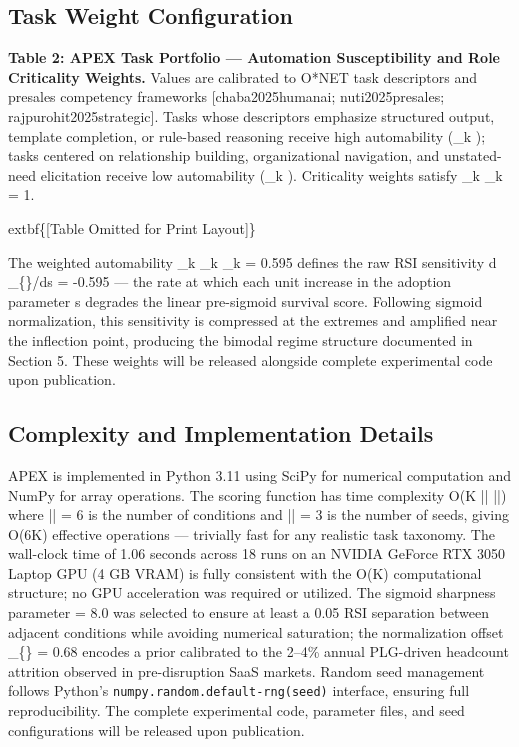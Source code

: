\documentclass[10pt, conference]{IEEEtran}
\begin{document}
{\subsection{Task Weight Configuration}

\label{sec:task_weight_configuration}

\textbf{Table 2: APEX Task Portfolio --- Automation Susceptibility and Role Criticality Weights.} Values are calibrated to O*NET task descriptors and presales competency frameworks [chaba2025humanai; nuti2025presales; rajpurohit2025strategic]. Tasks whose descriptors emphasize structured output, template completion, or rule-based reasoning receive high automability (\alpha\_k ); tasks centered on relationship building, organizational navigation, and unstated-need elicitation receive low automability (\alpha\_k ). Criticality weights satisfy \sum\_k \beta\_k = 1.

	extbf\{[Table Omitted for Print Layout]\}

The weighted automability \sum\_k \beta\_k \alpha\_k = 0.595 defines the raw RSI sensitivity d\,\_\{\}/ds = -0.595 --- the rate at which each unit increase in the adoption parameter s degrades the linear pre-sigmoid survival score. Following sigmoid normalization, this sensitivity is compressed at the extremes and amplified near the inflection point, producing the bimodal regime structure documented in Section 5. These weights will be released alongside complete experimental code upon publication.

\subsection{Complexity and Implementation Details}

\label{sec:complexity_and_implementation_details}

APEX is implemented in Python 3.11 using SciPy \cite{virtanen2020scipy} for numerical computation and NumPy for array operations. The scoring function has time complexity O(K \cdot || \cdot |\Xi|) where || = 6 is the number of conditions and |\Xi| = 3 is the number of seeds, giving O(6K) effective operations --- trivially fast for any realistic task taxonomy. The wall-clock time of 1.06 seconds across 18 runs on an NVIDIA GeForce RTX 3050 Laptop GPU (4 GB VRAM) is fully consistent with the O(K) computational structure; no GPU acceleration was required or utilized. The sigmoid sharpness parameter \lambda = 8.0 was selected to ensure at least a 0.05 RSI separation between adjacent conditions while avoiding numerical saturation; the normalization offset \mu\_\{\} = 0.68 encodes a prior calibrated to the 2--4\% annual PLG-driven headcount attrition observed in pre-disruption SaaS markets. Random seed management follows Python's \texttt{numpy.random.default-rng(seed)} interface, ensuring full reproducibility. The complete experimental code, parameter files, and seed configurations will be released upon publication.

}
\end{document}
